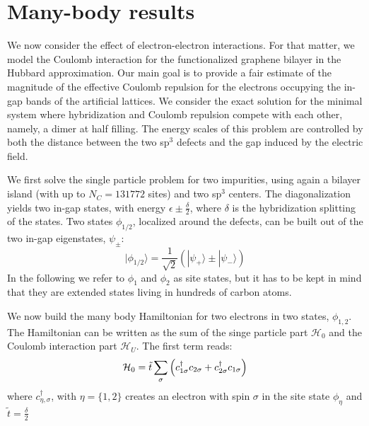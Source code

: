 \section{Many-body results}
We now consider the effect of electron-electron interactions. For that matter, we model the Coulomb interaction for the functionalized graphene bilayer in the Hubbard approximation. Our main goal is to provide a fair estimate
of the magnitude of the effective Coulomb repulsion for the electrons occupying the in-gap bands of the artificial lattices. We consider the exact solution for the minimal system where hybridization and Coulomb repulsion compete with each other, namely, a dimer at half filling. The energy scales of this problem are controlled by both the distance between the two sp$^3$ defects and the gap induced by the electric field.

We first solve the single particle problem for two impurities, using again a bilayer island (with up to $N_C=131772$ sites) and two sp$^3$ centers. The diagonalization yields two in-gap states, with energy $\epsilon\pm \frac{\delta}{2}$, where $\delta$ is the hybridization splitting of the states. 
Two states $\phi_{1/2}$, localized around the defects, can be built out of the two in-gap eigenstates, $\psi_\pm$:
\begin{equation}
  |\phi_{1/2}\rangle = \frac{1}{\sqrt{2}}\left(|\psi_+\rangle \pm|\psi_-\rangle\right)
\end{equation}
In the following we refer to $\phi_1$ and $\phi_2$ as site states, but it has to be kept in mind that they are extended states living in hundreds of carbon atoms. 

We now build the many body Hamiltonian for two electrons in two states, $\phi_{1,2}$. The Hamiltonian can be written as the sum of the singe particle part $\mathcal{H}_0$ and the Coulomb interaction part $\mathcal{H}_{U}$. The first term reads:
\begin{equation}
{\cal H}_0= \tilde{t} \sum_{\sigma} \left(c^{\dagger}_{1\sigma}c_{2\sigma}+c^{\dagger}_{2\sigma}c_{1\sigma}\right)
\end{equation} 
where $c^{\dagger}_{\eta,\sigma}$, with $\eta=\{1,2\}$ creates an electron with spin $\sigma$ in the site state $\phi_{\eta}$ and $\tilde{t}=\frac{\delta}{2}$

